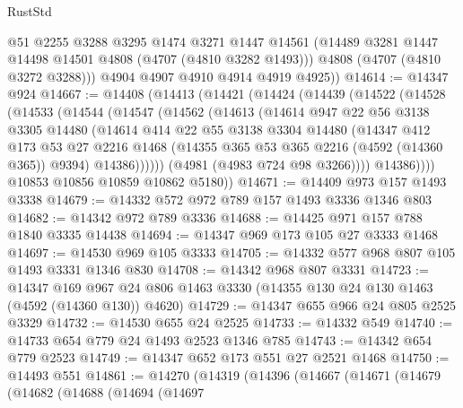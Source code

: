\begin{lexlean}{RustStd}
\begin{coremodule}
          @51
          @2255
          @3288
          @3295
          @1474
          @3271
          @1447
          @14561
          (@14489 @3281 @1447 @14498 @14501 @4808 (@4707 (@4810 @3282 @1493)))
          @4808
          (@4707 (@4810 @3272 @3288)))
        @4904
        @4907
        @4910
        @4914
        @4919
        @4925))
@14614 := @14347 @924
@14667 := @14408
    (@14413
      (@14421
        (@14424
          (@14439
            (@14522
              (@14528
                (@14533
                  (@14544
                    (@14547
                      (@14562
                        (@14613
                          (@14614
                            @947
                            @22
                            @56
                            @3138
                            @3305
                            @14480
                            (@14614
                              @414
                              @22
                              @55
                              @3138
                              @3304
                              @14480
                              (@14347
                                @412
                                @173
                                @53
                                @27
                                @2216
                                @1468
                                (@14355 @365 @53 @365 @2216 (@4592 (@14360 @365)) @9394)
                                @14386))))))
                    (@4981 (@4983 @724 @98 @3266))))
                @14386))))
        @10853
        @10856
        @10859
        @10862
        @5180))
@14671 := @14409 @973 @157 @1493 @3338
@14679 := @14332 @572 @972 @789 @157 @1493 @3336 @1346 @803
@14682 := @14342 @972 @789 @3336
@14688 := @14425 @971 @157 @788 @1840 @3335 @14438
@14694 := @14347 @969 @173 @105 @27 @3333 @1468
@14697 := @14530 @969 @105 @3333
@14705 := @14332 @577 @968 @807 @105 @1493 @3331 @1346 @830
@14708 := @14342 @968 @807 @3331
@14723 := @14347
    @169
    @967
    @24
    @806
    @1463
    @3330
    (@14355 @130 @24 @130 @1463 (@4592 (@14360 @130)) @4620)
@14729 := @14347 @655 @966 @24 @805 @2525 @3329
@14732 := @14530 @655 @24 @2525
@14733 := @14332 @549
@14740 := @14733 @654 @779 @24 @1493 @2523 @1346 @785
@14743 := @14342 @654 @779 @2523
@14749 := @14347 @652 @173 @551 @27 @2521 @1468
@14750 := @14493 @551
@14861 := @14270
    (@14319
      (@14396
        (@14667
          (@14671
            (@14679
              (@14682
                (@14688
                  (@14694
                    (@14697

\end{coremodule}
\end{lexlean}
